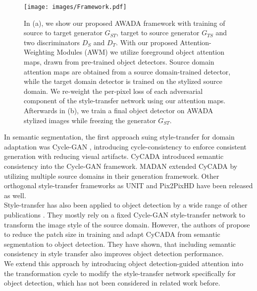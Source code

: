 \documentclass[10pt,twocolumn,letterpaper]{article}
\begin{document}
\begin{figure*}[t]
	\centering
	\texttt{[image: images/Framework.pdf]}
	\caption{In (a), we show our proposed AWADA framework with training of source to target generator $G_{ST}$, target to source generator $G_{TS}$ and two discriminators $D_{S}$ and $D_{T}$. With our proposed Attention-Weighting Modules (AWM) we utilize foreground object attention maps, drawn from pre-trained object detectors. Source domain attention maps are obtained from a source domain-trained detector, while the target domain detector is trained on the stylized source domain. We re-weight the per-pixel loss of each adversarial component of the style-transfer network using our attention maps. Afterwards in (b), we train a final object detector on AWADA stylized images while freezing the generator $G_{ST}$.}
	\label{fig:Framework}
\end{figure*}

In semantic segmentation, the first approach suing style-transfer for domain adaptation was Cycle-GAN \cite{CycleGAN}, introducing cycle-consistency to enforce consistent generation with reducing visual artifacts. CyCADA \cite{CyCADA} introduced semantic consistency into the Cycle-GAN framework. MADAN \cite{MADAN} extended CyCADA by utilizing multiple source domains in their generation framework. Other orthogonal style-transfer frameworks as UNIT \cite{UNIT} and Pix2PixHD \cite{pix2pixHD} have been released as well. \\
Style-transfer has also been applied to object detection by a wide range of other publications \cite{ProgressiveDomainAdaptation,UDA,Curriculum}. They mostly rely on a fixed Cycle-GAN style-transfer network to transform the image style of the source domain. However, the authors of \cite{menke2022} propose to reduce the patch size in training and adapt CyCADA from semantic segmentation to object detection. They have shown, that including semantic consistency in style transfer also improves object detection performance. \\
We extend this approach by introducing object detection-guided attention into the transformation cycle to modify the style-transfer network specifically for object detection, which has not been considered in related work before.
\end{document}
